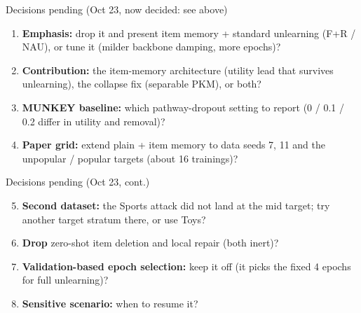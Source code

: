 \documentclass{beamer}
\begin{document}
\begin{frame}{Decisions pending (Oct 23, now decided: see above)}
\begin{enumerate}
  \item \textbf{Emphasis:} drop it and present item memory + standard
        unlearning (F+R / NAU), or tune it (milder backbone damping, more epochs)?
  \item \textbf{Contribution:} the item-memory architecture (utility lead that
        survives unlearning), the collapse fix (separable PKM), or both?
  \item \textbf{MUNKEY baseline:} which pathway-dropout setting to report
        (0 / 0.1 / 0.2 differ in utility and removal)?
  \item \textbf{Paper grid:} extend plain + item memory to data seeds 7, 11
        and the unpopular / popular targets (about 16 trainings)?
\end{enumerate}
\end{frame}

\begin{frame}{Decisions pending (Oct 23, cont.)}
\begin{enumerate}
  \setcounter{enumi}{4}
  \item \textbf{Second dataset:} the Sports attack did not land at the mid
        target; try another target stratum there, or use Toys?
  \item \textbf{Drop} zero-shot item deletion and local repair (both inert)?
  \item \textbf{Validation-based epoch selection:} keep it off (it picks the
        fixed 4 epochs for full unlearning)?
  \item \textbf{Sensitive scenario:} when to resume it?
\end{enumerate}
\end{frame}
\end{document}
